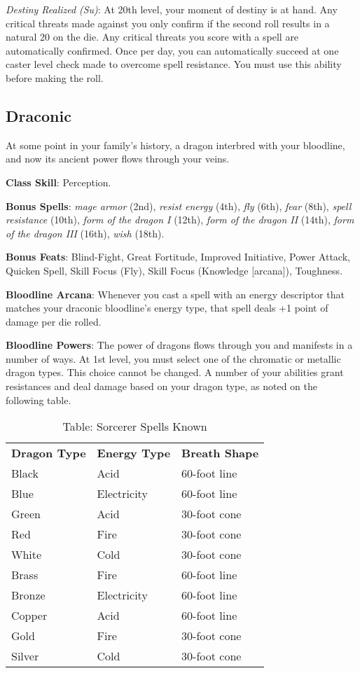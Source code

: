 \textit{Destiny Realized} \textit{(Su)}: At 20th level, your moment of destiny is at hand. Any critical threats made against you
only confirm if the second roll results in a natural 20 on the die. Any critical threats you score with a spell are automatically
confirmed. Once per day, you can automatically succeed at one caster level check made to overcome spell resistance. You must use 
this ability before making the roll.
				
\subsection{Draconic}

				
At some point in your family's history, a dragon interbred with your bloodline, and now its ancient power flows through your veins. 
				
\textbf{Class Skill}: Perception.
				
\textbf{Bonus Spells}: \textit{mage armor} (2nd), \textit{resist energy} (4th), \textit{fly} (6th), \textit{fear} (8th), 
\textit{spell resistance} (10th), \textit{form of the dragon I }(12th), \textit{form of the dragon II} (14th),
\textit{form of the dragon III }(16th), \textit{wish} (18th).

\textbf{Bonus Feats}: Blind-Fight, Great Fortitude, Improved Initiative, Power Attack, Quicken Spell, Skill Focus (Fly),
Skill Focus (Knowledge \mbox{$[$}arcana\mbox{$]$}), Toughness.

\textbf{Bloodline Arcana}: Whenever you cast a spell with an energy descriptor that matches your draconic bloodline's energy type,
that spell deals +1 point of damage per die rolled.

\textbf{Bloodline Powers}: The power of dragons flows through you and manifests in a number of ways. At 1st level, you must select 
one of the chromatic or metallic dragon types. This choice cannot be changed. A number of your abilities grant resistances and deal
damage based on your dragon type, as noted on the following table.

\begin{table}[]
\caption{Table: Sorcerer Spells Known}
\sffamily
\begin{tabular}{lll}
\textbf{Dragon Type} & \textbf{Energy Type} & \textbf{Breath Shape} \\
Black & Acid & 60-foot line \\
Blue & Electricity & 60-foot line \\
Green & Acid & 30-foot cone \\
Red & Fire & 30-foot cone \\
White & Cold & 30-foot cone \\
Brass & Fire & 60-foot line \\
Bronze & Electricity & 60-foot line\\
Copper & Acid & 60-foot line \\
Gold & Fire & 30-foot cone \\
Silver & Cold & 30-foot cone \\
\end{tabular}
\end{table}

